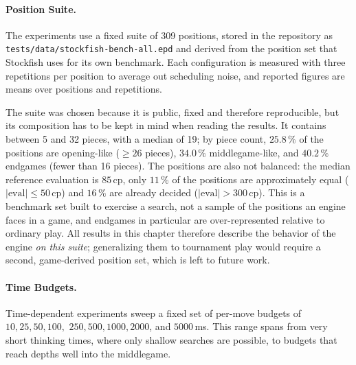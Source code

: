 \paragraph{Position Suite.}
The experiments use a fixed suite of 309 positions, stored in the repository as
\texttt{tests/\allowbreak data/\allowbreak stockfish-bench-all.epd} and derived from the position set
that Stockfish uses for its own benchmark. Each configuration is measured with three
repetitions per position to average out scheduling noise, and reported figures
are means over positions and repetitions.

The suite was chosen because it is public, fixed and therefore reproducible, but
its composition has to be kept in mind when reading the results. It contains
between 5 and 32 pieces, with a median of 19; by piece count, $25.8\,\%$ of the
positions are opening-like ($\geq 26$ pieces), $34.0\,\%$ middlegame-like, and
$40.2\,\%$ endgames (fewer than 16 pieces). The positions are also not balanced:
the median reference evaluation is $85$\,cp, only $11\,\%$ of the positions are
approximately equal ($|\text{eval}| \leq 50$\,cp) and $16\,\%$ are already
decided ($|\text{eval}| > 300$\,cp). This is a benchmark set built to exercise a
search, not a sample of the positions an engine faces in a game, and endgames in
particular are over-represented relative to ordinary play. All results in this
chapter therefore describe the behavior of the engine \emph{on this suite};
generalizing them to tournament play would require a second, game-derived
position set, which is left to future work.

\paragraph{Time Budgets.}
Time-dependent experiments sweep a fixed set of per-move budgets of
$10, 25, 50, 100,$ $250, 500, 1000, 2000$, and $5000$\,ms. This range spans from
very short thinking times, where only shallow searches are possible, to budgets
that reach depths well into the middlegame.

